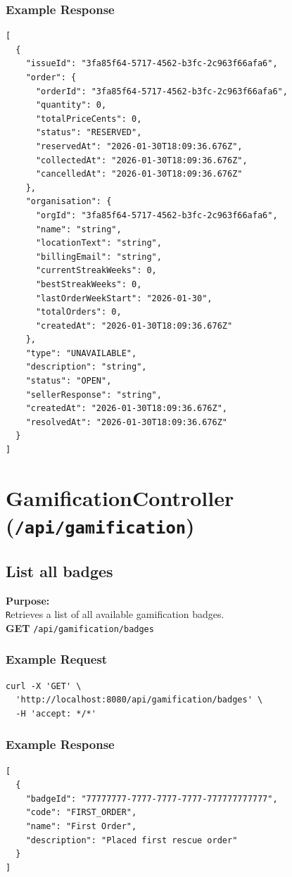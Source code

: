 \documentclass[a4paper,11pt]{article}
\begin{document}
\subsubsection*{Example Response}
\begin{lstlisting}
[
  {
    "issueId": "3fa85f64-5717-4562-b3fc-2c963f66afa6",
    "order": {
      "orderId": "3fa85f64-5717-4562-b3fc-2c963f66afa6",
      "quantity": 0,
      "totalPriceCents": 0,
      "status": "RESERVED",
      "reservedAt": "2026-01-30T18:09:36.676Z",
      "collectedAt": "2026-01-30T18:09:36.676Z",
      "cancelledAt": "2026-01-30T18:09:36.676Z"
    },
    "organisation": {
      "orgId": "3fa85f64-5717-4562-b3fc-2c963f66afa6",
      "name": "string",
      "locationText": "string",
      "billingEmail": "string",
      "currentStreakWeeks": 0,
      "bestStreakWeeks": 0,
      "lastOrderWeekStart": "2026-01-30",
      "totalOrders": 0,
      "createdAt": "2026-01-30T18:09:36.676Z"
    },
    "type": "UNAVAILABLE",
    "description": "string",
    "status": "OPEN",
    "sellerResponse": "string",
    "createdAt": "2026-01-30T18:09:36.676Z",
    "resolvedAt": "2026-01-30T18:09:36.676Z"
  }
]
\end{lstlisting}

\section{GamificationController (\texttt{/api/gamification})}

\subsection{List all badges}
\textbf{Purpose:} \\ \texttt Retrieves a list of all available gamification badges. \\

\textbf{GET} \texttt{/api/gamification/badges}

\subsubsection*{Example Request}
\begin{lstlisting}
curl -X 'GET' \
  'http://localhost:8080/api/gamification/badges' \
  -H 'accept: */*'
\end{lstlisting}

\subsubsection*{Example Response}
\begin{lstlisting}
[
  {
    "badgeId": "77777777-7777-7777-7777-777777777777",
    "code": "FIRST_ORDER",
    "name": "First Order",
    "description": "Placed first rescue order"
  }
]
\end{lstlisting}
\end{document}
